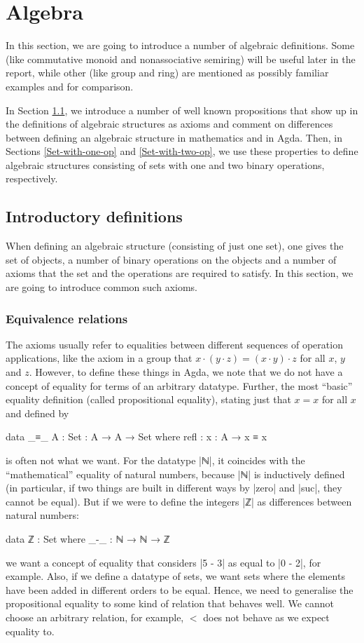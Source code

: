 \chapter{Algebra}
\label{Algebra}
\label{Section:Algebra}
In this section, we are going to introduce a number of algebraic definitions. Some (like commutative monoid and nonassociative semiring) will be useful later in the report, while other (like group and ring) are mentioned as possibly familiar examples and for comparison.

In Section \ref{Intro-defs}, we introduce a number of well known propositions that show up in the definitions of algebraic structures as axioms and comment on differences between defining an algebraic structure in mathematics and in Agda. Then, in Sections \ref{Set-with-one-op} and \ref{Set-with-two-op}, we use these properties to define algebraic structures consisting of sets with one and two binary operations, respectively.
\section{Introductory definitions}
\label{Intro-defs}
When defining an algebraic structure (consisting of just one set), one gives the set of objects, a number of binary operations on the objects and a number of axioms that the set and the operations are required to satisfy. In this section, we are going to introduce common such axioms. 
\subsection{Equivalence relations}
\label{Algebra-equality}
The axioms usually refer to equalities between different sequences of operation applications, like the axiom in a group that $x \cdot (y \cdot z) = (x \cdot y) \cdot z$ for all $x$, $y$ and $z$. However, to define these things in Agda, we note that we do not have a concept of equality for terms of an arbitrary datatype. Further, the most ``basic'' equality definition (called propositional equality), stating just that $x = x$ for all $x$ and defined by
\begin{code}
data _≡_ {A : Set} : A → A → Set where
  refl : {x : A} → x ≡ x
\end{code}
is often not what we want. For the datatype |ℕ|, it coincides with the ``mathematical'' equality of natural numbers, because |ℕ| is inductively defined (in particular, if two things are built in different ways by |zero| and |suc|, they cannot be equal). But if we were to define the integers |ℤ| as differences between natural numbers:
\begin{code}
data ℤ : Set where
  _-_ : ℕ → ℕ → ℤ
\end{code}
we want a concept of equality that considers |5 - 3| as equal to |0 - 2|, for example. Also, if we define a datatype of sets, we want sets where the elements have been added in different orders to be equal. Hence, we need to generalise the propositional equality to some kind of relation that behaves well. We cannot choose an arbitrary relation, for example, $<$ does not behave as we expect equality to. 

